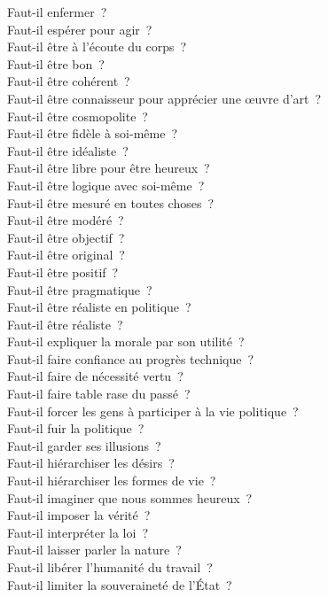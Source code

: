 \documentclass[a4paper,12pt]{article}
\begin{document}
Faut-il enfermer ? \\
Faut-il espérer pour agir ? \\
Faut-il être à l'écoute du corps ? \\
Faut-il être bon ? \\
Faut-il être cohérent ? \\
Faut-il être connaisseur pour apprécier une œuvre d'art ? \\
Faut-il être cosmopolite ? \\
Faut-il être fidèle à soi-même ? \\
Faut-il être idéaliste ? \\
Faut-il être libre pour être heureux ? \\
Faut-il être logique avec soi-même ? \\
Faut-il être mesuré en toutes choses ? \\
Faut-il être modéré ? \\
Faut-il être objectif ? \\
Faut-il être original ? \\
Faut-il être positif ? \\
Faut-il être pragmatique ? \\
Faut-il être réaliste en politique ? \\
Faut-il être réaliste ? \\
Faut-il expliquer la morale par son utilité ? \\
Faut-il faire confiance au progrès technique ? \\
Faut-il faire de nécessité vertu ? \\
Faut-il faire table rase du passé ? \\
Faut-il forcer les gens à participer à la vie politique ? \\
Faut-il fuir la politique ? \\
Faut-il garder ses illusions ? \\
Faut-il hiérarchiser les désirs ? \\
Faut-il hiérarchiser les formes de vie ? \\
Faut-il imaginer que nous sommes heureux ? \\
Faut-il imposer la vérité ? \\
Faut-il interpréter la loi ? \\
Faut-il laisser parler la nature ? \\
Faut-il libérer l'humanité du travail ? \\
Faut-il limiter la souveraineté de l'État ? \\
\end{document}
